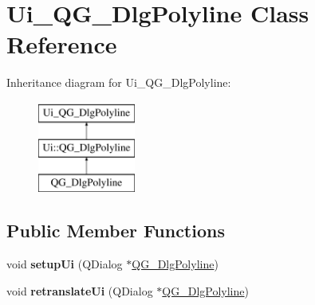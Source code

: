 \hypertarget{classUi__QG__DlgPolyline}{\section{Ui\-\_\-\-Q\-G\-\_\-\-Dlg\-Polyline Class Reference}
\label{classUi__QG__DlgPolyline}
}
Inheritance diagram for Ui\-\_\-\-Q\-G\-\_\-\-Dlg\-Polyline\-:\begin{figure}[H]
\begin{center}
\leavevmode
\includegraphics[height=3.000000cm]{classUi__QG__DlgPolyline}
\end{center}
\end{figure}
\subsection*{Public Member Functions}
\begin{DoxyCompactItemize}
\item 
\hypertarget{classUi__QG__DlgPolyline_aaf6e54c754d0f42f6c5b7c528c6868a0}{void {\bfseries setup\-Ui} (Q\-Dialog $\ast$\hyperlink{classQG__DlgPolyline}{Q\-G\-\_\-\-Dlg\-Polyline})}\label{classUi__QG__DlgPolyline_aaf6e54c754d0f42f6c5b7c528c6868a0}

\item 
\hypertarget{classUi__QG__DlgPolyline_aa65f6a37d7abf3abab1425f71fb67dd1}{void {\bfseries retranslate\-Ui} (Q\-Dialog $\ast$\hyperlink{classQG__DlgPolyline}{Q\-G\-\_\-\-Dlg\-Polyline})}\label{classUi__QG__DlgPolyline_aa65f6a37d7abf3abab1425f71fb67dd1}

\end{DoxyCompactItemize}
